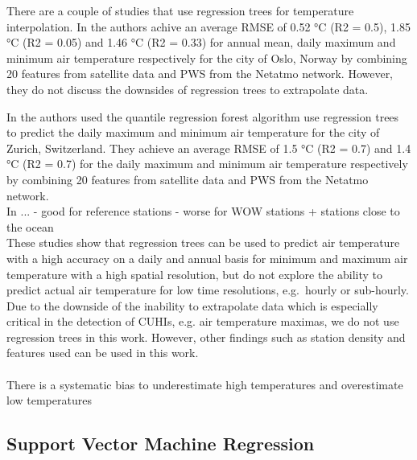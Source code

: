 
There are a couple of studies that use regression trees for temperature interpolation. In \cite{venter2020hyperlocal} the authors achive an average RMSE of 0.52 °C (R2 = 0.5), 1.85 °C (R2 = 0.05) and 1.46 °C (R2 = 0.33) for annual mean, daily maximum and minimum air temperature respectively for the city of Oslo, Norway by combining 20 features from satellite data and PWS from the Netatmo network. However, they do not discuss the downsides of regression trees to extrapolate data.

In \cite{zumwald2021mapping} the authors used the quantile regression forest algorithm
use regression trees to predict the daily maximum and minimum air temperature for the city of Zurich, Switzerland. They achieve an average RMSE of 1.5 °C (R2 = 0.7) and 1.4 °C (R2 = 0.7) for the daily maximum and minimum air temperature respectively by combining 20 features from satellite data and PWS from the Netatmo network.\\

In \cite{ho2014mapping}... %
- good for reference stations
- worse for WOW stations + stations close to the ocean\\

These studies show that regression trees can be used to predict air temperature with a high accuracy on a daily and annual basis for minimum and maximum air temperature with a high spatial resolution, but do not explore the ability to predict actual air temperature for low time resolutions, e.g.\ hourly or sub-hourly.\\
Due to the downside of the inability to extrapolate data which is especially critical in the detection of CUHIs, e.g. air temperature maximas, we do not use regression trees in this work. However, other findings such as station density and features used can be used in this work.\\
\\

There is a systematic bias to underestimate high temperatures and overestimate low temperatures~\cite{zumwald2021mapping, zhang2012bias}

\subsection{Support Vector Machine Regression}

